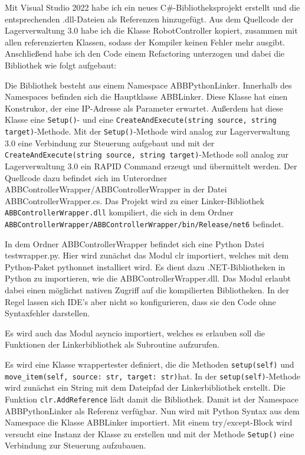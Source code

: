 Mit Visual Studio 2022 habe ich ein neues C\#-Bibliotheksprojekt erstellt und die entsprechenden \glq .dll\grq{}-Dateien als Referenzen hinzugefügt.
Aus dem Quellcode der Lagerverwaltung 3.0 habe ich die Klasse \glq RobotController\grq{} kopiert, zusammen mit allen referenzierten Klassen, sodass der Kompiler keinen Fehler mehr ausgibt.
Anschließend habe ich den Code einem Refactoring unterzogen und dabei die Bibliothek wie folgt aufgebaut:

Die Bibliothek besteht aus einem Namespace \glq ABBPythonLinker\grq{}.
Innerhalb des Namespaces befinden sich die Hauptklasse \glq ABBLinker\grq{}. 
Diese Klasse hat einen Konstrukor, der eine IP-Adresse als Parameter erwartet.
Außerdem hat diese Klasse eine \verb|Setup()|- und eine \verb|CreateAndExecute(string source, string target)|-Methode. 
Mit der \verb|Setup()|-Methode wird analog zur Lagerverwaltung 3.0 eine Verbindung zur Steuerung aufgebaut und mit der 
\verb|CreateAndExecute(string source, string target)|-Methode soll analog zur Lagerverwaltung 3.0 ein RAPID Command erzeugt und übermittelt werden.
Der Quellcode dazu befindet sich im Unterordner \glq ABBControllerWrapper/ABBControllerWrapper\grq{} in der Datei \glq ABBControllerWrapper.cs\grq{}.
Das Projekt wird zu einer Linker-Bibliothek \verb|ABBControllerWrapper.dll| kompiliert, die sich in dem Ordner \verb|ABBControllerWrapper/ABBControllerWrapper/bin/Release/net6| befindet.

In dem Ordner \glq ABBControllerWrapper \grq{} befindet sich eine Python Datei \glq testwrapper.py\grq{}.
Hier wird zunächst das Modul \glq clr\grq{} importiert, welches mit dem Python-Paket \glq pythonnet\grq{} installiert wird.
Es dient dazu .NET-Bibliotheken in Python zu importieren, wie die \glq ABBControllerWrapper.dll\grq{}.
Das Modul erlaubt dabei einen möglichst nativen Zugriff auf die kompilierten Bibliotheken. In der Regel lassen sich IDE's aber nicht so konfigurieren, 
dass sie den Code ohne Syntaxfehler darstellen.

Es wird auch das Modul \glq asyncio\grq{} importiert, welches es erlauben soll die Funktionen der Linkerbibliothek als Subroutine aufzurufen. 

Es wird eine Klasse \glq wrappertester\grq{} definiert, die die Methoden \verb|setup(self)| und \\ \verb|move_item(self, source: str, target: str)|hat.
In der \verb|setup(self)|-Methode wird zunächst ein String mit dem Dateipfad der Linkerbibliothek erstellt. 
Die Funktion \verb|clr.AddReference| lädt damit die Bibliothek.
Damit ist der Namespace \glq ABBPythonLinker\grq{} als Referenz verfügbar. Nun wird mit Python Syntax aus dem Namespace die Klasse \glq ABBLinker\grq{} importiert.
Mit einem try/except-Block wird versucht eine Instanz der Klasse zu erstellen und mit der Methode \verb|Setup()| eine Verbindung zur Steuerung aufzubauen.

